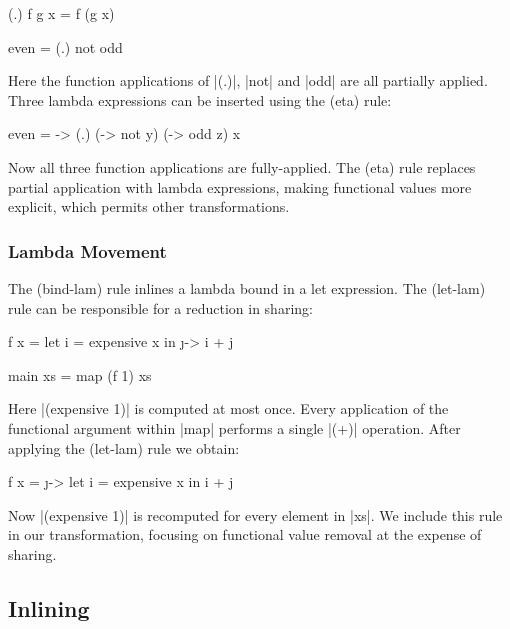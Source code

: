 \documentclass[preprint]{sigplanconf}
\begin{document}
\begin{example}
\ignore\begin{code}
(.) f g x = f (g x)

even = (.) not odd
\end{code}

\noindent Here the function applications of |(.)|, |not| and |odd| are all partially applied. Three lambda expressions can be inserted using the (eta) rule:

\begin{code}
even = \x -> (.) (\y -> not y) (\z -> odd z) x
\end{code}

\noindent Now all three function applications are fully-applied. The (eta) rule replaces partial application with lambda expressions, making functional values more explicit, which permits other transformations.
\end{example}

\subsubsection{Lambda Movement}
\label{sec:sharing}

The (bind-lam) rule inlines a lambda bound in a let expression. The (let-lam) rule can be responsible for a reduction in sharing:

\begin{example}
\begin{code}
f x =  let  i = expensive x
       in   \j -> i + j

main xs = map (f 1) xs
\end{code}

\noindent Here |(expensive 1)| is computed at most once. Every application of the functional argument within |map| performs a single |(+)| operation. After applying the (let-lam) rule we obtain:

\begin{code}
f x =  \j ->  let  i = expensive x
              in   i + j
\end{code}

\noindent Now |(expensive 1)| is recomputed for every element in |xs|. We include this rule in our transformation, focusing on functional value removal at the expense of sharing.
\end{example}

\subsection{Inlining}
\label{sec:inlining}
\end{document}
